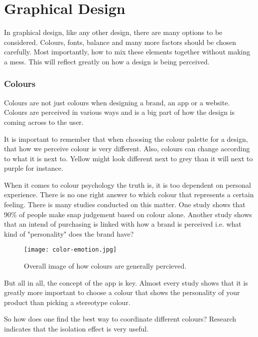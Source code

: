 \section{Graphical Design}
In graphical design, like any other design, there are many options to be considered. Colours, fonts, balance and many more factors should be chosen carefully. Most importantly, how to mix these elements together without making a mess. 
This will reflect greatly on how a design is being perceived. \cite{ColorMeaning}

\subsubsection{Colours}

Colours are not just colours when designing a brand, an app or a website. Colours are perceived in various ways and is a big part of how the design is coming  across to the user. \cite{ColorMeaning}

It is important to remember that when choosing the colour palette for a design, that how we perceive colour is very different. Also, colours can change according to what it is next to. Yellow might look different next to grey than it will next to purple for instance. \cite{Colour}

When it comes to colour psychology the truth is, it is too dependent on personal experience. There is no one right answer to which colour that represents a certain feeling. \cite{ColorMeaning}
There is many studies conducted on this matter. 
One study shows that 90\% of people make snap judgement based on colour alone. \cite{ColorMeaning} Another study shows that an intend of purchasing is linked with how a brand is perceived i.e. what kind of "personality" does the brand have?\cite{ColorMeaning}

\begin{figure}[H]
\centering
\texttt{[image: color-emotion.jpg]}
\caption{Overall image of how colours are generally percieved. \cite{ColorMeaning}}
\end{figure}

But all in all, the concept of the app is key. Almost every study shows that it is greatly more important to choose a colour that shows the personality of your product than picking a stereotype colour. \cite{ColorMeaning}

So how does one find the best way to coordinate different colours? Research indicates that the isolation effect is very useful.

